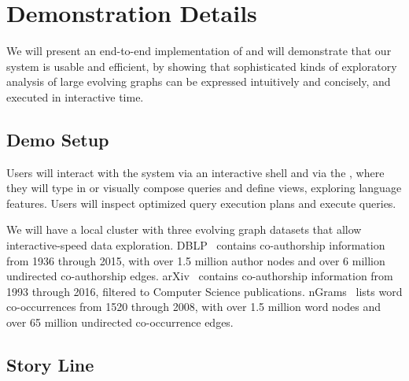 \section{Demonstration Details}
\label{sec:demo}

We will present an end-to-end implementation of \ql and will
demonstrate that our system is usable and efficient, by showing that
sophisticated kinds of exploratory analysis of large evolving graphs
can be expressed intuitively and concisely, and executed in
interactive time.

\subsection{Demo Setup}
\label{sec:setup}

Users will interact with the \ql system via an interactive shell and
via the \qlui, where they will type in or visually compose queries and
define \tg views, exploring language features.  Users will inspect optimized query execution plans
and execute queries.

We will have a local cluster with three evolving graph datasets that
allow interactive-speed data exploration.  DBLP~\cite{dblp} contains
co-authorship information from 1936 through 2015, with over 1.5
million author nodes and over 6 million undirected co-authorship
edges.  arXiv~\cite{arxiv} contains co-authorship information from
1993 through 2016, filtered to Computer Science publications.
nGrams~\cite{nGrams} lists word co-occurrences from 1520 through
2008, with over 1.5 million word nodes and over 65 million undirected
co-occurrence edges.  

\subsection{Story Line}
\label{sec:story}



